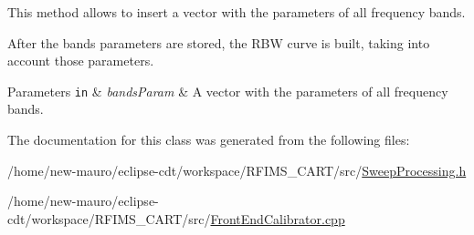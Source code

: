 This method allows to insert a vector with the parameters of all frequency bands. 

After the bands\textquotesingle{} parameters are stored, the R\+BW curve is built, taking into account those parameters. 
\begin{DoxyParams}[1]{Parameters}
\mbox{\tt in}  & {\em bands\+Param} & A vector with the parameters of all frequency bands. \\
\hline
\end{DoxyParams}


The documentation for this class was generated from the following files\+:\begin{DoxyCompactItemize}
\item 
/home/new-\/mauro/eclipse-\/cdt/workspace/\+R\+F\+I\+M\+S\+\_\+\+C\+A\+R\+T/src/\hyperlink{SweepProcessing_8h}{Sweep\+Processing.\+h}\item 
/home/new-\/mauro/eclipse-\/cdt/workspace/\+R\+F\+I\+M\+S\+\_\+\+C\+A\+R\+T/src/\hyperlink{FrontEndCalibrator_8cpp}{Front\+End\+Calibrator.\+cpp}\end{DoxyCompactItemize}
